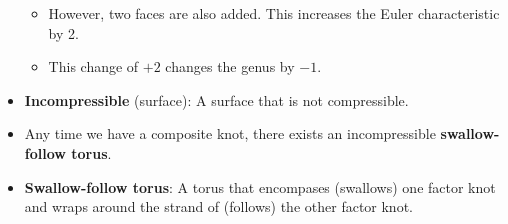 \documentclass[titlepage]{article}
\numberwithin{figure}{section}
\numberwithin{table}{section}
\numberwithin{equation}{section}
\begin{document}
\begin{itemize}
\begin{itemize}
        \item However, two faces are also added. This increases the Euler characteristic by 2.
        \item This change of $+2$ changes the genus by $-1$.
    \end{itemize}
    \item \textbf{Incompressible} (surface): A surface that is not compressible.
    \item Any time we have a composite knot, there exists an incompressible \textbf{swallow-follow torus}.
    \item \textbf{Swallow-follow torus}: A torus that encompases (swallows) one factor knot and wraps around the strand of (follows) the other factor knot.
\end{itemize}
\end{document}
